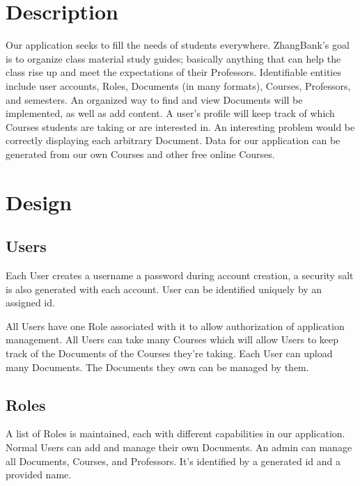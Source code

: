 \documentclass[11pt]{article}
\title{}
\author{}
\date{\today}
\begin{document}


\section*{Description}
\label{sec-1}


  Our application seeks to fill the needs of students
  everywhere. ZhangBank's goal is to organize class material study
  guides; basically anything that can help the class rise up and meet
  the expectations of their Professors. Identifiable entities include
  user accounts, Roles, Documents (in many formats), Courses,
  Professors, and semesters. An organized way to find and view
  Documents will be implemented, as well as add content. A user's
  profile will keep track of which Courses students are taking or are
  interested in. An interesting problem would be correctly displaying
  each arbitrary Document. Data for our application can be generated
  from our own Courses and other free online Courses.
  
\section*{Design}
\label{sec-2}

  
\subsection*{Users}
\label{sec-2-1}

   
   Each User creates a username a password during account creation, a
   security salt is also generated with each account. User can be
   identified uniquely by an assigned id.

   All Users have one Role associated with it to allow authorization
   of application management.  All Users can take many Courses which
   will allow Users to keep track of the Documents of the Courses
   they're taking. Each User can upload many Documents. The Documents
   they own can be managed by them.
\subsection*{Roles}
\label{sec-2-2}


   A list of Roles is maintained, each with different capabilities in
   our application.  Normal Users can add and manage their own
   Documents. An admin can manage all Documents, Courses, and
   Professors.  It's identified by a generated id and a provided name.
\end{document}
